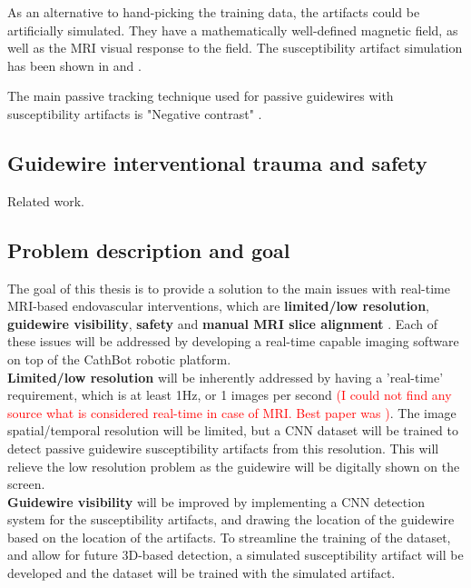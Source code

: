 \documentclass{article}
\begin{document}
As an alternative to hand-picking the training data, the artifacts could be artificially simulated. They have a mathematically well-defined magnetic field, as well as the MRI visual response to the field. The susceptibility artifact simulation has been shown in \cite{sim_of_suscept_artifact} and \cite{sus-artifact-subvoxel-sim}.

The main passive tracking technique used for passive guidewires with susceptibility artifacts is "Negative contrast" \cite{active-vs-passive-tracking}.

\subsection{Guidewire interventional trauma and safety}
Related work.

\subsection{Problem description and goal}
The goal of this thesis is to provide a solution to the main issues with real-time MRI-based endovascular interventions, which are \textbf{limited/low resolution}, \textbf{guidewire visibility}, \textbf{safety} and \textbf{manual MRI slice alignment} \cite{pmid35420239}. Each of these issues will be addressed by developing a real-time capable imaging software on top of the CathBot robotic platform. \\

\textbf{Limited/low resolution} will be inherently addressed by having a 'real-time' requirement, which is at least 1Hz, or 1 images per second \textcolor{red}{(I could not find any source what is considered real-time in  case of MRI. Best paper was \cite{real-time-mri})}. The image spatial/temporal resolution will be limited, but a CNN dataset will be trained to detect passive guidewire susceptibility artifacts from this resolution. This will relieve the low resolution problem as the guidewire will be digitally shown on the screen.\\

\textbf{Guidewire visibility} will be improved by implementing a CNN detection system for the susceptibility artifacts, and drawing the location of the guidewire based on the location of the artifacts. To streamline the training of the dataset, and allow for future 3D-based detection, a simulated susceptibility artifact will be developed and the dataset will be trained with the simulated artifact.\\
\end{document}
